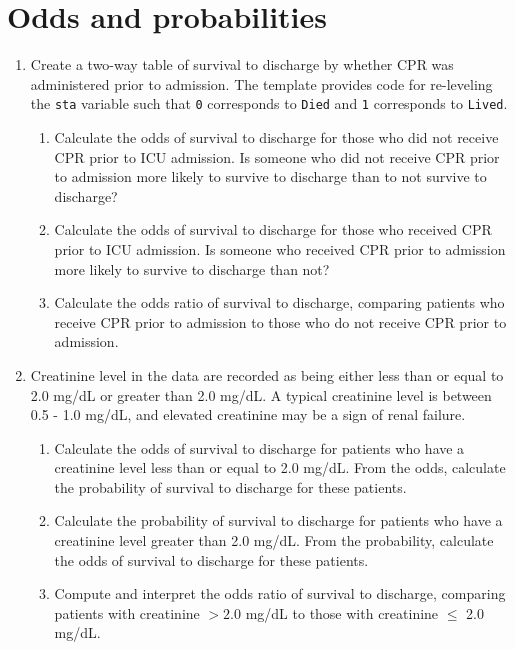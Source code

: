 \documentclass[letterpaper,12pt,twoside,]{pinp}
\begin{document}
\newpage

\hypertarget{odds-and-probabilities}{%
\section{Odds and probabilities}\label{odds-and-probabilities}}

\begin{enumerate}
\def\labelenumi{\arabic{enumi}.}
\item
  Create a two-way table of survival to discharge by whether CPR was
  administered prior to admission. The template provides code for
  re-leveling the \texttt{sta} variable such that \texttt{0} corresponds
  to \texttt{Died} and \texttt{1} corresponds to \texttt{Lived}.

  \begin{enumerate}
  \def\labelenumii{\alph{enumii})}
  \item
    Calculate the odds of survival to discharge for those who did not
    receive CPR prior to ICU admission. Is someone who did not receive
    CPR prior to admission more likely to survive to discharge than to
    not survive to discharge?
  \item
    Calculate the odds of survival to discharge for those who received
    CPR prior to ICU admission. Is someone who received CPR prior to
    admission more likely to survive to discharge than not?
  \item
    Calculate the odds ratio of survival to discharge, comparing
    patients who receive CPR prior to admission to those who do not
    receive CPR prior to admission.
  \end{enumerate}
\item
  Creatinine level in the data are recorded as being either less than or
  equal to 2.0 mg/dL or greater than 2.0 mg/dL. A typical creatinine
  level is between 0.5 - 1.0 mg/dL, and elevated creatinine may be a
  sign of renal failure.

  \begin{enumerate}
  \def\labelenumii{\alph{enumii})}
  \item
    Calculate the odds of survival to discharge for patients who have a
    creatinine level less than or equal to 2.0 mg/dL. From the odds,
    calculate the probability of survival to discharge for these
    patients.
  \item
    Calculate the probability of survival to discharge for patients who
    have a creatinine level greater than 2.0 mg/dL. From the
    probability, calculate the odds of survival to discharge for these
    patients.
  \item
    Compute and interpret the odds ratio of survival to discharge,
    comparing patients with creatinine \(> 2.0\) mg/dL to those with
    creatinine \(\leq\) 2.0 mg/dL.
  \end{enumerate}
\end{enumerate}
\end{document}
